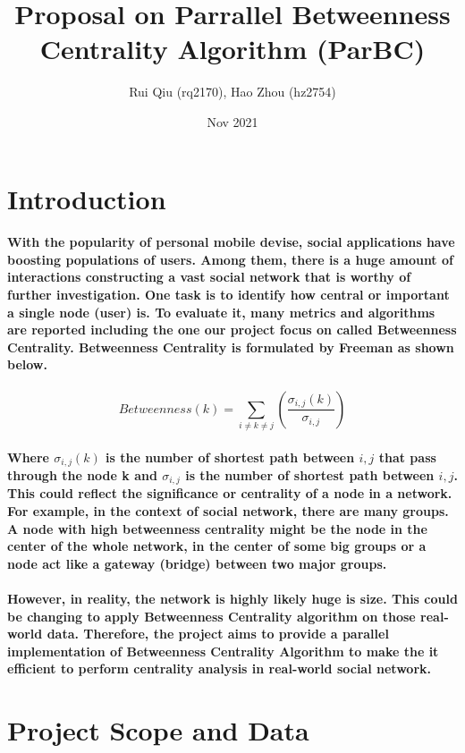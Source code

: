 \documentclass{article}
\title{Proposal on Parrallel Betweenness Centrality Algorithm (ParBC)}
\author{Rui Qiu (rq2170), Hao Zhou (hz2754)}
\date{Nov 2021}
\begin{document}
\maketitle

\section{Introduction}
\paragraph{
With the popularity of personal mobile devise, social applications have boosting populations of users. Among them, there is a huge amount of interactions constructing a vast social network that is worthy of further investigation. One task is to identify how central or important a single node (user) is. To evaluate it, many metrics and algorithms are reported including the one our project focus on called Betweenness Centrality. Betweenness Centrality is formulated by Freeman \cite{freeman1977set} as shown below.
}

\[Betweenness(k) = \sum_{i \neq k \neq j}(\frac{\sigma_{i,j}(k)}{\sigma_{i,j}}) \]
\paragraph{
Where $\sigma_{i,j}(k)$ is the number of shortest path between $i, j$ that pass through the node k and $\sigma_{i,j}$ is the number of shortest path between $i, j$. This could reflect the significance or centrality of a node in a network. For example, in the context of social network, there are many groups. A node with high betweenness centrality might be the node in the center of the whole network, in the center of some big groups or a node act like a gateway (bridge) between two major groups. 
}
\paragraph{
However, in reality, the network is highly likely huge is size. This could be changing to apply Betweenness Centrality algorithm on those real-world data. Therefore, the project aims to provide a parallel implementation of Betweenness Centrality Algorithm to make the it efficient to perform centrality analysis in real-world social network.
}
\section{Project Scope and Data}
\end{document}
